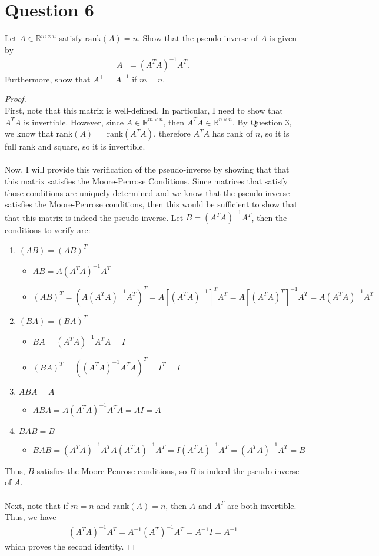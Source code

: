 \documentclass[10pt,a4paper]{article}
\theoremstyle{definition}
\theoremstyle{definition}
\numberwithin{equation}{section}
\begin{document}
\section*{Question 6}
Let $A \in \mathbb{R}^{m \times n}$ satisfy $\text{rank}(A) = n$. Show that the pseudo-inverse of $A$ is given by 
\begin{align*}
A^+ = (A^T A)^{-1} A^T.
\end{align*}
Furthermore, show that $A^+ = A^{-1}$ if $m = n$. 

\begin{proof}$ $
\\First, note that this matrix is well-defined. In particular, I need to show that $A^TA$ is invertible. However, since $A \in \mathbb{R}^{m \times n}$, then $A^T A \in \mathbb{R}^{n \times n}$. By Question 3, we know that rank$(A) = $ rank$(A^TA)$, therefore $A^TA$ has rank of $n$, so it is full rank and square, so it is invertible.
\\
\\Now, I will provide this verification of the pseudo-inverse by showing that that this matrix satisfies the Moore-Penrose Conditions. Since matrices that satisfy those conditions are uniquely determined and we know that the pseudo-inverse satisfies the Moore-Penrose conditions, then this would be sufficient to show that that this matrix is indeed the pseudo-inverse. Let $B = (A^TA)^{-1}A^T$, then the conditions to verify are:
\begin{enumerate}
\item $(AB) = (AB)^T$
	\begin{itemize}
	\item $AB = A (A^TA)^{-1}A^T$
	\item $(AB)^T = (A (A^TA)^{-1}A^T)^T = A [(A^TA)^{-1}]^T A^T = A [(A^TA)^T]^{-1} A^T = A (A^T A)^{-1} A^T$
	\end{itemize}
\item $(BA) = (BA)^T$
	\begin{itemize}
	\item $BA = (A^TA)^{-1}A^T A = I$
	\item $(BA)^T = ((A^TA)^{-1}A^T A)^T = I^T = I$
	\end{itemize}
\item $ABA = A$
	\begin{itemize}
	\item $ABA = A (A^TA)^{-1}A^T A = A I = A$
	\end{itemize}
\item $BAB = B$
	\begin{itemize}
	\item $BAB = (A^TA)^{-1}A^T A (A^TA)^{-1}A^T = I (A^TA)^{-1}A^T = (A^TA)^{-1}A^T = B$
	\end{itemize}
\end{enumerate}
Thus, $B$ satisfies the Moore-Penrose conditions, so $B$ is indeed the pseudo inverse of $A$.
\\
\\Next, note that if $m = n$ and rank$(A) = n$, then $A$ and $A^T$ are both invertible. Thus, we have
\begin{align*}
(A^T A)^{-1} A^T = A^{-1} (A^T)^{-1} A^T = A^{-1} I = A^{-1}
\end{align*}
which proves the second identity. 
\end{proof}
\end{document}
